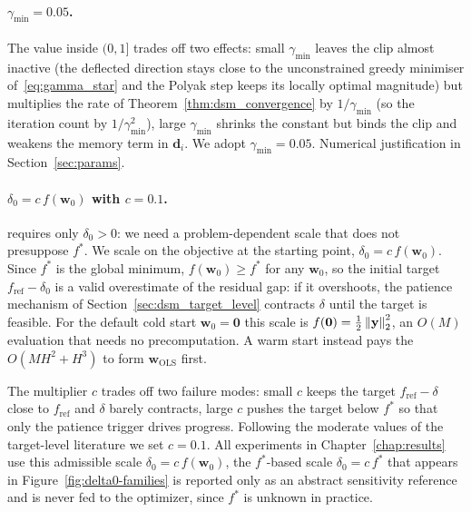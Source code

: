 \paragraph{$\gamma_{\min} = 0.05$.}
The value inside $(0, 1]$ trades off two effects: small $\gamma_{\min}$ leaves the clip almost inactive (the deflected direction stays close to the unconstrained greedy minimiser of~\eqref{eq:gamma_star} and the Polyak step keeps its locally optimal magnitude) but multiplies the rate of Theorem~\ref{thm:dsm_convergence} by $1/\gamma_{\min}$ (so the iteration count by $1/\gamma_{\min}^2$), large $\gamma_{\min}$ shrinks the constant but binds the clip and weakens the memory term in $\mathbf{d}_i$. We adopt $\gamma_{\min} = 0.05$. Numerical justification in Section~\ref{sec:params}.

\paragraph{$\delta_0 = c\,f(\mathbf{w}_0)$ with $c = 0.1$.}
\cite[Lemma~3.8]{dantonio2009deflected} requires only $\delta_0 > 0$: we need a problem-dependent scale that does not presuppose $f^*$. We scale on the objective at the starting point, $\delta_0 = c\,f(\mathbf{w}_0)$. Since $f^*$ is the global minimum, $f(\mathbf{w}_0) \ge f^*$ for any $\mathbf{w}_0$, so the initial target $f_{\mathrm{ref}} - \delta_0$ is a valid overestimate of the residual gap: if it overshoots, the patience mechanism of Section~\ref{sec:dsm_target_level} contracts $\delta$ until the target is feasible. For the default cold start $\mathbf{w}_0 = \mathbf{0}$ this scale is $f(\mathbf{0}) = \tfrac12\left\lVert \mathbf{y} \right\rVert_2^2$, an $O(M)$ evaluation that needs no precomputation. A warm start instead pays the $O(MH^2 + H^3)$ to form $\mathbf{w}_{\mathrm{OLS}}$ first.

The multiplier $c$ trades off two failure modes: small $c$ keeps the target $f_{\mathrm{ref}} - \delta$ close to $f_{\mathrm{ref}}$ and $\delta$ barely contracts, large $c$ pushes the target below $f^*$ so that only the patience trigger drives progress. Following the moderate values of the target-level literature \cite{brannlund1995generalized,goffin1999convergence,bertsekas1999nonlinear} we set $c = 0.1$. All experiments in Chapter~\ref{chap:results} use this admissible scale $\delta_0 = c\,f(\mathbf{w}_0)$, the $f^*$-based scale $\delta_0 = c\,f^*$ that appears in Figure~\ref{fig:delta0-families} is reported only as an abstract sensitivity reference and is never fed to the optimizer, since $f^*$ is unknown in practice.

